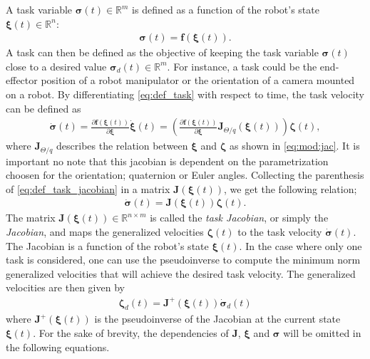 A task variable $\bm{\sigma}(t) \in \mathbb{R}^m$ is defined as a function of the robot's
state $\bm{\xi}(t) \in \mathbb{R}^n$:
\begin{align}
    \bm{\sigma}(t) = \bm{f}(\bm{\xi}(t)) \label{eq:def_task}.
\end{align}
A task can then be defined as the objective of keeping the task variable $\bm{\sigma}(t)$
close to a desired value $\bm{\sigma}_d(t) \in \mathbb{R}^m$. For instance, a task could
be the end-effector position of a robot manipulator or the orientation of a camera mounted
on a robot. By differentiating \autoref{eq:def_task} with respect to time, the task velocity
can be defined as
\begin{align}
    \dot{\bm{\sigma}}(t) = \frac{\partial \bm{f}(\bm{\xi}(t))}{\partial \bm{\xi}}
    \dot{\bm{\xi}}(t)= \left(\frac{\partial \bm{f}(\bm{\xi}(t))}{\partial \bm{\xi}}
    \bm{J}_{\Theta/q}(\bm{\xi}(t)) \right)\bm{\zeta}(t) \label{eq:def_task_jacobian},
\end{align}
where \(\bm{J}_{\Theta/q}\) describes the relation between \(\bm{\xi}\) and \(\bm{\zeta}\)
as shown in \autoref{eq:mod:jac}. It is important no note that this jacobian is dependent
on the parametrization choosen for the orientation; quaternion or Euler angles.
Collecting the parenthesis of \autoref{eq:def_task_jacobian} in a matrix
\(\bm{J}(\bm{\xi}(t))\), we get the following relation;
\begin{align}
    \dot{\bm{\sigma}}(t) = \bm{J}(\bm{\xi}(t))\bm{\zeta}(t).
\end{align}
The matrix \(\bm{J}(\bm{\xi}(t)) \in \mathbb{R}^{n \times m}\) is called the
\emph{task Jacobian}, or simply the \emph{Jacobian}, and maps the generalized
velocities $\bm{\zeta}(t)$ to the task velocity $\dot{\bm{\sigma}}(t)$.
The Jacobian is a function of the robot's state \(\bm{\xi}(t)\).
In the case where only one task is considered, one can use the pseudoinverse
to compute the minimum norm generalized velocities that will achieve the desired
task velocity. The generalized velocities are then given by
\begin{align}
    \bm{\zeta}_d(t) = \bm{J}^{+}(\bm{\xi}(t)) \dot{\bm{\sigma}}_d(t) \label{eq:task_priority}
\end{align}
where \(\bm{J}^{+}(\bm{\xi}(t))\) is the pseudoinverse of the Jacobian at the current
state \(\bm{\xi}(t)\). For the sake of brevity, the dependencies of $\bm{J}$, \(\bm{\xi}\) and $\bm{\sigma}$ will be omitted
in the following equations.

